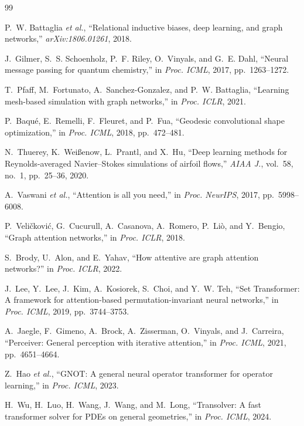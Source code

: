 \documentclass[journal]{IEEEtran}
\begin{document}
\begin{thebibliography}{99}

P.~W. Battaglia \emph{et al.}, ``Relational inductive biases, deep learning, and
graph networks,'' \emph{arXiv:1806.01261}, 2018.

J.~Gilmer, S.~S. Schoenholz, P.~F. Riley, O.~Vinyals, and G.~E. Dahl, ``Neural
message passing for quantum chemistry,'' in \emph{Proc. ICML}, 2017,
pp.~1263--1272.

T.~Pfaff, M.~Fortunato, A.~Sanchez-Gonzalez, and P.~W. Battaglia, ``Learning
mesh-based simulation with graph networks,'' in \emph{Proc. ICLR}, 2021.

P.~Baqu\'e, E.~Remelli, F.~Fleuret, and P.~Fua, ``Geodesic convolutional shape
optimization,'' in \emph{Proc. ICML}, 2018, pp.~472--481.

N.~Thuerey, K.~Wei{\ss}enow, L.~Prantl, and X.~Hu, ``Deep learning methods for
Reynolds-averaged Navier--Stokes simulations of airfoil flows,'' \emph{AIAA
J.}, vol.~58, no.~1, pp.~25--36, 2020.

A.~Vaswani \emph{et al.}, ``Attention is all you need,'' in \emph{Proc.
NeurIPS}, 2017, pp.~5998--6008.

P.~Veli\v{c}kovi\'c, G.~Cucurull, A.~Casanova, A.~Romero, P.~Li\`o, and
Y.~Bengio, ``Graph attention networks,'' in \emph{Proc. ICLR}, 2018.

S.~Brody, U.~Alon, and E.~Yahav, ``How attentive are graph attention
networks?'' in \emph{Proc. ICLR}, 2022.

J.~Lee, Y.~Lee, J.~Kim, A.~Kosiorek, S.~Choi, and Y.~W. Teh, ``Set
Transformer: A framework for attention-based permutation-invariant neural
networks,'' in \emph{Proc. ICML}, 2019, pp.~3744--3753.

A.~Jaegle, F.~Gimeno, A.~Brock, A.~Zisserman, O.~Vinyals, and J.~Carreira,
``Perceiver: General perception with iterative attention,'' in \emph{Proc.
ICML}, 2021, pp.~4651--4664.

Z.~Hao \emph{et al.}, ``GNOT: A general neural operator transformer for
operator learning,'' in \emph{Proc. ICML}, 2023.

H.~Wu, H.~Luo, H.~Wang, J.~Wang, and M.~Long, ``Transolver: A fast transformer
solver for PDEs on general geometries,'' in \emph{Proc. ICML}, 2024.


\end{thebibliography}
\end{document}
